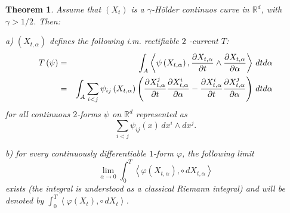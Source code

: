 \documentclass{article}
\newtheorem{theorem}{Theorem}
\begin{document}
\begin{theorem}
\label{th:prop_key1}
Assume that $\left( X_{t}\right) $ is a $\gamma $-H\"{o}lder continuos curve
in $\mathbb{R}^{d}$, with $\gamma >1/2$. Then:

a) $\left( X_{t,\alpha }\right) $ defines the following i.m. rectifiable $2$%
-current $T$: 
\begin{eqnarray*}
T\left( \psi \right)  &=&\int_{A}\left\langle \psi \left( X_{t,\alpha
}\right) ,\frac{\partial X_{t,\alpha }}{\partial t}\wedge \frac{\partial
X_{t,\alpha }}{\partial \alpha }\right\rangle \,dtd\alpha  \\
&=&\int_{A}\sum_{i<j}\psi _{ij}\left( X_{t,\alpha }\right) \left( \frac{%
\partial X_{t,\alpha }^{j}}{\partial t}\frac{\partial X_{t,\alpha }^{i}}{%
\partial \alpha }-\frac{\partial X_{t,\alpha }^{i}}{\partial t}\frac{%
\partial X_{t,\alpha }^{j}}{\partial \alpha }\right) \,dtd\alpha 
\end{eqnarray*}
for all continuous $2$-forms $\psi $ on $\mathbb{R}^{d}$ represented as 
\begin{equation*}
\sum_{i<j}\psi _{ij}\left( x\right) \,dx^{i}\wedge dx^{j}.
\end{equation*}

b) for every continuously differentiable $1$-form $\varphi $, the following
limit 
\begin{equation*}
\lim_{\alpha \rightarrow 0}\int_{0}^{T}\left\langle \varphi \left(
X_{t,\alpha }\right) ,\circ \,dX_{t,\alpha }\right\rangle 
\end{equation*}
exists (the integral is understood as a classical Riemann integral) and will
be denoted by $\int_{0}^{T}\left\langle \varphi \left( X_{t}\right) ,\circ
\,dX_{t}\right\rangle $.


\end{theorem}
\end{document}

